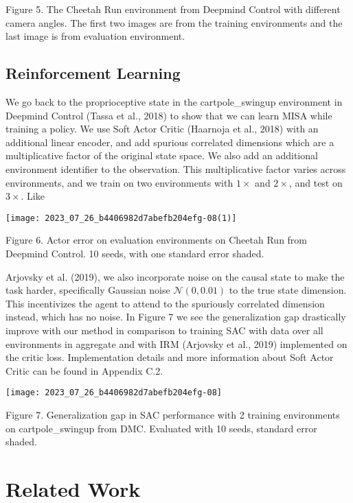 \documentclass[10pt]{article}
\begin{document}
Figure 5. The Cheetah Run environment from Deepmind Control with different camera angles. The first two images are from the training environments and the last image is from evaluation environment.

\subsection{Reinforcement Learning}
We go back to the proprioceptive state in the cartpole\_swingup environment in Deepmind Control (Tassa et al., 2018) to show that we can learn MISA while training a policy. We use Soft Actor Critic (Haarnoja et al., 2018) with an additional linear encoder, and add spurious correlated dimensions which are a multiplicative factor of the original state space. We also add an additional environment identifier to the observation. This multiplicative factor varies across environments, and we train on two environments with $1 \times$ and $2 \times$, and test on $3 \times$. Like

\begin{center}
\texttt{[image: 2023\_07\_26\_b4406982d7abefb204efg-08(1)]}
\end{center}

Figure 6. Actor error on evaluation environments on Cheetah Run from Deepmind Control. 10 seeds, with one standard error shaded.

Arjovsky et al. (2019), we also incorporate noise on the causal state to make the task harder, specifically Gaussian noise $\mathcal{N}(0,0.01)$ to the true state dimension. This incentivizes the agent to attend to the spuriously correlated dimension instead, which has no noise. In Figure 7 we see the generalization gap drastically improve with our method in comparison to training SAC with data over all environments in aggregate and with IRM (Arjovsky et al., 2019) implemented on the critic loss. Implementation details and more information about Soft Actor Critic can be found in Appendix C.2.

\begin{center}
\texttt{[image: 2023\_07\_26\_b4406982d7abefb204efg-08]}
\end{center}

Figure 7. Generalization gap in SAC performance with 2 training environments on cartpole\_swingup from DMC. Evaluated with 10 seeds, standard error shaded.

\section{Related Work}
\end{document}

